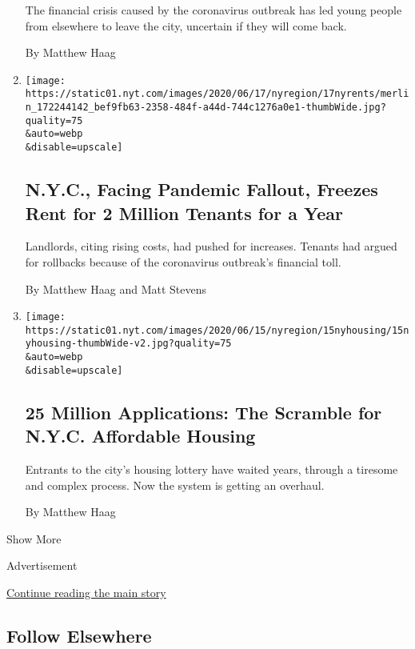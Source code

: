\begin{enumerate}
  The financial crisis caused by the coronavirus outbreak has led young
  people from elsewhere to leave the city, uncertain if they will come
  back.

  By Matthew Haag
\item
  \href{/2020/06/17/nyregion/nyc-rent-guidelines-board-freeze.html}{}

  \texttt{[image: https://static01.nyt.com/images/2020/06/17/nyregion/17nyrents/merlin\_172244142\_bef9fb63-2358-484f-a44d-744c1276a0e1-thumbWide.jpg?quality=75\\\&auto=webp\\\&disable=upscale]}

  \hypertarget{nyc-facing-pandemic-fallout-freezes-rent-for-2-million-tenants-for-a-year}{%
  \subsection{N.Y.C., Facing Pandemic Fallout, Freezes Rent for 2
  Million Tenants for a
  Year}\label{nyc-facing-pandemic-fallout-freezes-rent-for-2-million-tenants-for-a-year}}

  Landlords, citing rising costs, had pushed for increases. Tenants had
  argued for rollbacks because of the coronavirus outbreak's financial
  toll.

  By Matthew Haag and Matt Stevens
\item
  \href{/2020/06/15/nyregion/nyc-affordable-housing-lottery.html}{}

  \texttt{[image: https://static01.nyt.com/images/2020/06/15/nyregion/15nyhousing/15nyhousing-thumbWide-v2.jpg?quality=75\\\&auto=webp\\\&disable=upscale]}

  \hypertarget{25-million-applications-the-scramble-for-nyc-affordable-housing}{%
  \subsection{25 Million Applications: The Scramble for N.Y.C.
  Affordable
  Housing}\label{25-million-applications-the-scramble-for-nyc-affordable-housing}}

  Entrants to the city's housing lottery have waited years, through a
  tiresome and complex process. Now the system is getting an overhaul.

  By Matthew Haag
\end{enumerate}

Show More

Advertisement

\protect\hyperlink{after-mid2}{Continue reading the main story}

\hypertarget{follow-elsewhere}{%
\subsection{Follow Elsewhere}\label{follow-elsewhere}}

